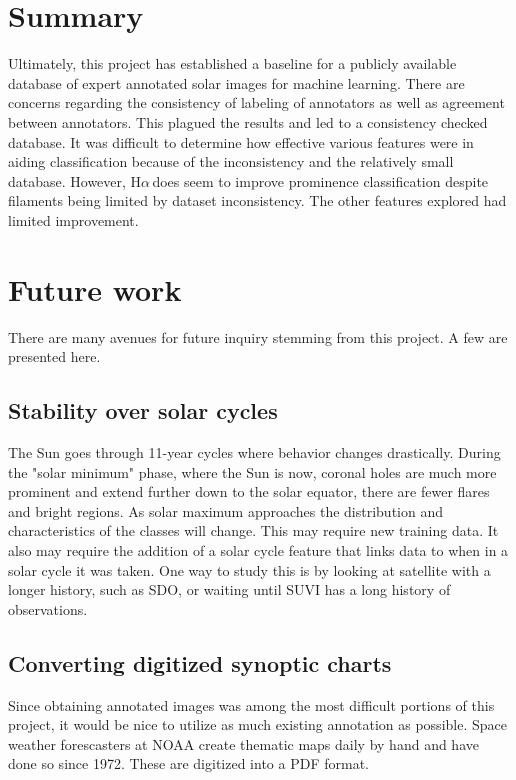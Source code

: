 \documentclass[twoside]{report}
\newcommand{\halpha}{H$\alpha$\,}
\begin{document}
\section{Summary}
Ultimately, this project has established a baseline for a publicly available database of expert annotated solar images for machine learning. There are concerns regarding the consistency of labeling of annotators as well as agreement between annotators. This plagued the results and led to a consistency checked database. It was difficult to determine how effective various features were in aiding classification because of the inconsistency and the relatively small database. However, \halpha does seem to improve prominence classification despite filaments being limited by dataset inconsistency. The other features explored had limited improvement.

\section{Future work}
There are many avenues for future inquiry stemming from this project. A few are presented here. 

\subsection{Stability over solar cycles}
The Sun goes through 11-year cycles where behavior changes drastically. During the "solar minimum" phase, where the Sun is now, coronal holes are much more prominent and extend further down to the solar equator, there are fewer flares and bright regions. As solar maximum approaches the distribution and characteristics of the classes will change. This may require new training data. It also may require the addition of a solar cycle feature that links data to when in a solar cycle it was taken. One way to study this is by looking at satellite with a longer history, such as SDO, or waiting until SUVI has a long history of observations. 

\subsection{Converting digitized synoptic charts}
Since obtaining annotated images was among the most difficult portions of this project, it would be nice to utilize as much existing annotation as possible. Space weather forescasters at NOAA create thematic maps daily by hand and have done so since 1972. These are digitized into a PDF format. 
\end{document}
